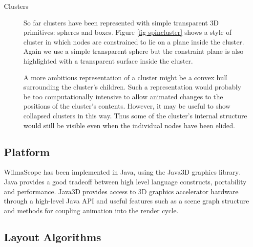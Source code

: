 \documentclass[runningheads]{cl2emult}
\begin{document}
\begin{description}
\item[Clusters] So far clusters have been represented with simple
transparent 3D
primitives: spheres and boxes.  Figure \ref{fig-spincluster} shows a
style of cluster in which nodes are constrained to lie on a plane
inside the cluster.  Again we use a simple transparent sphere but the
constraint plane is also highlighted with a transparent surface inside
the cluster.

A more ambitious representation of a cluster might be a convex hull
surrounding the cluster's children.  Such a representation
would probably be too computationally intensive to allow animated
changes to the positions of the cluster's contents.  However, it may
be useful to show collapsed clusters in this way.  Thus some of the
cluster's internal structure would still be visible even when the
individual nodes have been elided.

\end{description}


\subsection{Platform}

WilmaScope has been implemented in Java, using the Java3D graphics library.
Java provides a good tradeoff between high level language constructs,
portability and performance.  Java3D provides access to 3D graphics accelerator hardware through
a high-level Java API and useful features such as a scene graph
structure and methods for coupling animation into the render cycle.

\subsection{Layout Algorithms}
\end{document}
